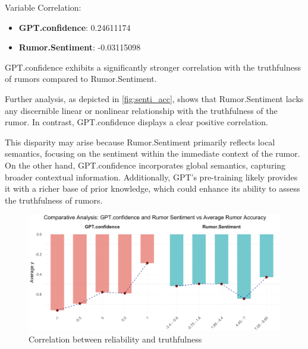 Variable Correlation:

\begin{itemize}
    \item \textbf{GPT.confidence}: 0.24611174
    \item \textbf{Rumor.Sentiment}: -0.03115098
\end{itemize}






GPT.confidence exhibits a significantly stronger correlation with the truthfulness of rumors compared to Rumor.Sentiment.

Further analysis, as depicted in \autoref{fig:senti_acc}, shows that Rumor.Sentiment lacks any discernible linear or nonlinear relationship with the truthfulness of the rumor. In contrast, GPT.confidence displays a clear positive correlation.

This disparity may arise because Rumor.Sentiment primarily reflects local semantics, focusing on the sentiment within the immediate context of the rumor. On the other hand, GPT.confidence incorporates global semantics, capturing broader contextual information. Additionally, GPT's pre-training likely provides it with a richer base of prior knowledge, which could enhance its ability to assess the truthfulness of rumors.

\begin{figure}[ht]
    \centering
    \includegraphics[width=.8\textwidth]{figs/senti_acc.png}
    \caption{
       Correlation between reliability and truthfulness %
    }\label{fig:senti_acc}
\end{figure}

